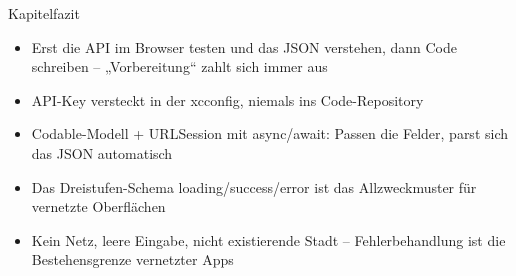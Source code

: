 \begin{tcbsummary}{Kapitelfazit}
\begin{itemize}
  \item Erst die API im Browser testen und das JSON verstehen, dann Code schreiben – „Vorbereitung“ zahlt sich immer aus
  \item API-Key versteckt in der xcconfig, niemals ins Code-Repository
  \item Codable-Modell + URLSession mit async/await: Passen die Felder, parst sich das JSON automatisch
  \item Das Dreistufen-Schema loading/success/error ist das Allzweckmuster für vernetzte Oberflächen
  \item Kein Netz, leere Eingabe, nicht existierende Stadt – Fehlerbehandlung ist die Bestehensgrenze vernetzter Apps
\end{itemize}

\end{tcbsummary}
